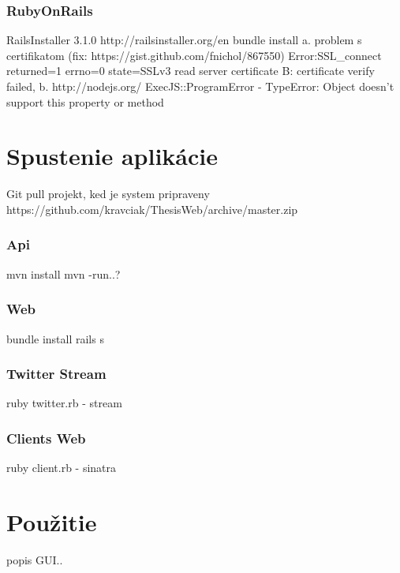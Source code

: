 \subsubsection{RubyOnRails}
RailsInstaller 3.1.0	http://railsinstaller.org/en
bundle install
	a. problem s certifikatom (fix: https://gist.github.com/fnichol/867550)
		Error:SSL\_connect returned=1 errno=0 state=SSLv3 read server certificate B: certificate verify failed,
	b. http://nodejs.org/
		ExecJS::ProgramError - TypeError: Object doesn't support this property or method


\section{Spustenie aplikácie}
Git pull projekt, ked je system pripraveny
https://github.com/kravciak/ThesisWeb/archive/master.zip

\subsubsection{Api}
mvn install
mvn -run..?
\subsubsection{Web}
bundle install
rails s
\subsubsection{Twitter Stream}
ruby twitter.rb - stream
\subsubsection{Clients Web}
ruby client.rb - sinatra

\section{Použitie}
popis GUI..